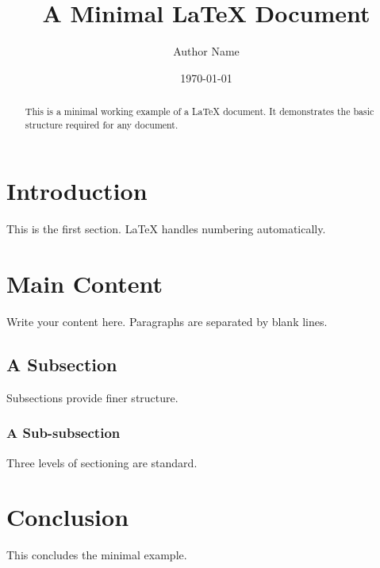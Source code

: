 \documentclass[12pt,a4paper]{article}
\title{A Minimal LaTeX Document}
\author{Author Name}
\date{\today}
\begin{document}
\maketitle

\begin{abstract}
This is a minimal working example of a \LaTeX{} document.
It demonstrates the basic structure required for any document.
\end{abstract}

\section{Introduction}
This is the first section. \LaTeX{} handles numbering automatically.

\section{Main Content}
Write your content here. Paragraphs are separated by blank lines.

\subsection{A Subsection}
Subsections provide finer structure.

\subsubsection{A Sub-subsection}
Three levels of sectioning are standard.

\section{Conclusion}
This concludes the minimal example.
\end{document}
